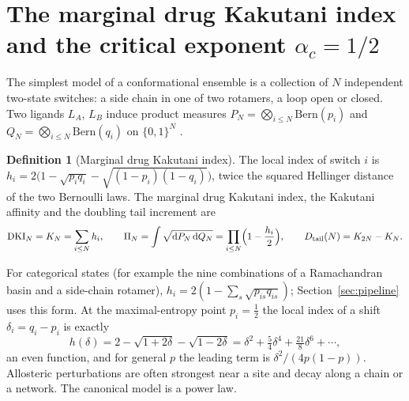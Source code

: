 \documentclass[11pt,reqno]{amsart}
\theoremstyle{plain}
\theoremstyle{definition}
\newtheorem{definition}[theorem]{Definition}
\theoremstyle{remark}
\numberwithin{equation}{section}
\newcommand{\dd}{\mathrm{d}}
\newcommand{\DKI}{\mathrm{DKI}}
\begin{document}
\section{The marginal drug Kakutani index and the critical exponent \texorpdfstring{$\alpha_c=1/2$}{alpha\_c=1/2}}
\label{sec:dki}

The simplest model of a conformational ensemble is a collection of $N$ independent two-state switches: a side chain in one of two rotamers, a loop open or closed. Two ligands $L_A$, $L_B$ induce product measures $P_N=\bigotimes_{i\le N}\mathrm{Bern}(p_i)$ and $Q_N=\bigotimes_{i\le N}\mathrm{Bern}(q_i)$ on $\{0,1\}^N$ \cite{ChenChen2026I}.

\begin{definition}[Marginal drug Kakutani index]\label{def:dki}
The local index of switch $i$ is $h_i=2\bigl(1-\sqrt{p_iq_i}-\sqrt{(1-p_i)(1-q_i)}\bigr)$, twice the squared Hellinger distance of the two Bernoulli laws. The marginal drug Kakutani index, the Kakutani affinity and the doubling tail increment are
\begin{equation}\label{eq:dki}
\DKI_N=K_N=\sum_{i\le N}h_i,\qquad \Pi_N=\int\sqrt{\dd P_N\,\dd Q_N}=\prod_{i\le N}\Bigl(1-\frac{h_i}2\Bigr),\qquad D_{\mathrm{tail}}(N)=K_{2N}-K_N .
\end{equation}
\end{definition}

For categorical states (for example the nine combinations of a Ramachandran basin and a side-chain rotamer), $h_i=2(1-\sum_s\sqrt{p_{is}q_{is}})$; Section~\ref{sec:pipeline} uses this form. At the maximal-entropy point $p_i=\tfrac12$ the local index of a shift $\delta_i=q_i-p_i$ is exactly
\begin{equation}\label{eq:htaylor}
h(\delta)=2-\sqrt{1+2\delta}-\sqrt{1-2\delta}=\delta^2+\tfrac54\delta^4+\tfrac{21}8\delta^6+\cdots,
\end{equation}
an even function, and for general $p$ the leading term is $\delta^2/(4p(1-p))$. Allosteric perturbations are often strongest near a site and decay along a chain or a network. The canonical model is a power law.
\end{document}
